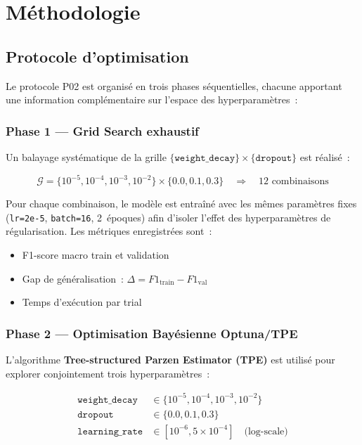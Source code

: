 \documentclass[12pt,a4paper]{article}
\begin{document}
\section{Méthodologie}
\label{sec:methodologie}

\subsection{Protocole d'optimisation}
\label{ssec:protocole}

Le protocole P02 est organisé en trois phases séquentielles, chacune apportant
une information complémentaire sur l'espace des hyperparamètres~:

\subsubsection{Phase 1 — Grid Search exhaustif}

Un balayage systématique de la grille $\{\texttt{weight\_decay}\} \times
\{\texttt{dropout}\}$ est réalisé~:

\begin{equation}
  \label{eq:grid}
  \mathcal{G} = \{10^{-5}, 10^{-4}, 10^{-3}, 10^{-2}\} \times \{0.0, 0.1, 0.3\}
  \quad \Rightarrow \quad 12 \text{ combinaisons}
\end{equation}

Pour chaque combinaison, le modèle est entraîné avec les mêmes paramètres fixes
(\texttt{lr=2e-5}, \texttt{batch=16}, 2~époques) afin d'isoler l'effet des
hyperparamètres de régularisation. Les métriques enregistrées sont~:

\begin{itemize}
  \item F1-score macro train et validation
  \item Gap de généralisation~: $\Delta = F1_{\text{train}} - F1_{\text{val}}$
  \item Temps d'exécution par trial
\end{itemize}

\subsubsection{Phase 2 — Optimisation Bayésienne Optuna/TPE}

L'algorithme \textbf{Tree-structured Parzen Estimator (TPE)} \citep{bergstra2011algorithms}
est utilisé pour explorer conjointement trois hyperparamètres~:

\begin{align}
  \texttt{weight\_decay} &\in \{10^{-5}, 10^{-4}, 10^{-3}, 10^{-2}\} \\
  \texttt{dropout}       &\in \{0.0, 0.1, 0.3\} \\
  \texttt{learning\_rate} &\in [10^{-6}, 5 \times 10^{-4}] \quad \text{(log-scale)}
\end{align}
\end{document}
